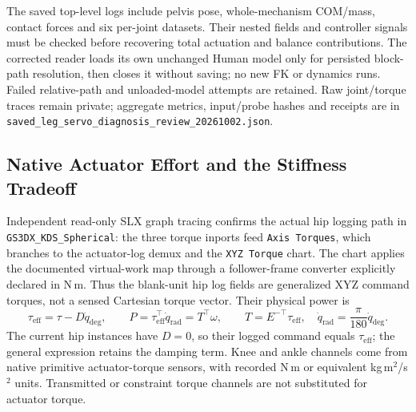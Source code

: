 \documentclass[11pt,a4paper]{article}
\begin{document}
The saved top-level logs include pelvis pose, whole-mechanism COM/mass,
contact forces and six per-joint datasets. Their nested fields and controller
signals must be checked before recovering total actuation and balance
contributions. The corrected reader loads its own unchanged Human model
only for persisted block-path resolution, then closes it without saving;
no new FK or dynamics runs. Failed relative-path and unloaded-model attempts
are retained. Raw joint/torque traces remain private; aggregate metrics,
input/probe hashes and receipts are in
\texttt{saved\_leg\_servo\_diagnosis\_review\_20261002.json}.


\subsection{Native Actuator Effort and the Stiffness Tradeoff}
Independent read-only SLX graph tracing confirms the actual hip logging
path in \texttt{GS3DX\_KDS\_Spherical}: the three torque inports feed
\texttt{Axis Torques}, which branches to the actuator-log demux and the
\texttt{XYZ Torque} chart. The chart applies the documented virtual-work
map through a follower-frame converter explicitly declared in N\,m.
Thus the blank-unit hip log fields are generalized XYZ command torques,
not a sensed Cartesian torque vector. Their physical power is
\begin{equation}
 \tau_{\mathrm{eff}}=\tau-D\dot q_{\mathrm{deg}},\qquad
 P=\tau_{\mathrm{eff}}^\top\dot q_{\mathrm{rad}}=T^\top\omega,
 \qquad T=E^{-\top}\tau_{\mathrm{eff}},
 \quad \dot q_{\mathrm{rad}}=\frac{\pi}{180}\dot q_{\mathrm{deg}}.
\end{equation}
The current hip instances have $D=0$, so their logged command equals
$\tau_{\mathrm{eff}}$; the general expression retains the damping term.
Knee and ankle channels come from native primitive actuator-torque sensors,
with recorded N\,m or equivalent kg\,m$^2$/s$^2$ units. Transmitted or
constraint torque channels are not substituted for actuator torque.
\end{document}
